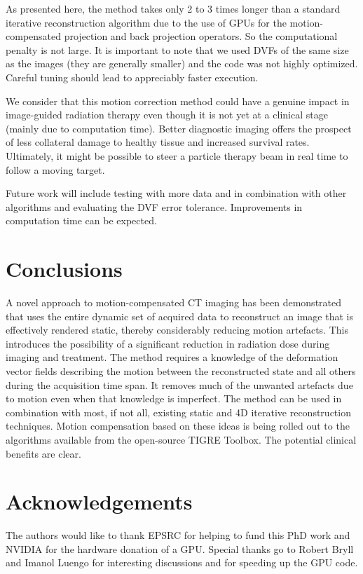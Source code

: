 As presented here, the method takes only 2 to 3 times longer than a standard iterative reconstruction algorithm due to the use of GPUs for the motion-compensated projection and back projection operators.  So the computational penalty is not large.  It is important to note that we used DVFs of the same size as the images (they are generally smaller) and the code was not highly optimized.  Careful tuning should lead to appreciably faster execution.

We consider that this motion correction method could have a genuine impact in image-guided radiation therapy even though it is not yet at a clinical stage (mainly due to computation time).  Better diagnostic imaging offers the prospect of less collateral damage to healthy tissue and increased survival rates.  Ultimately, it might be possible to steer a particle therapy beam in real time to follow a moving target. 

Future work will include testing with more data and in combination with other algorithms and evaluating the DVF error tolerance.  Improvements in computation time can be expected.


	
\section{Conclusions}
A novel approach to motion-compensated CT imaging has been demonstrated that uses the entire dynamic set of acquired data to reconstruct an image that is effectively rendered static, thereby considerably reducing motion artefacts.  This introduces the possibility of a significant reduction in radiation dose during imaging and treatment.  The method requires a knowledge of the deformation vector fields describing the motion between the reconstructed state and all others during the acquisition time span.  It removes much of the unwanted artefacts due to motion even when that knowledge is imperfect.  The method can be used in combination with most, if not all, existing static and 4D iterative reconstruction techniques.  Motion compensation based on these ideas is being rolled out to the algorithms available from the open-source TIGRE Toolbox\cite{TIGREweb}.  The potential clinical benefits are clear.



\section{Acknowledgements}
The authors would like to thank EPSRC for helping to fund this PhD work and NVIDIA for the hardware donation of a GPU.  Special thanks go to Robert Bryll and Imanol Luengo for interesting discussions and for speeding up the GPU code.
